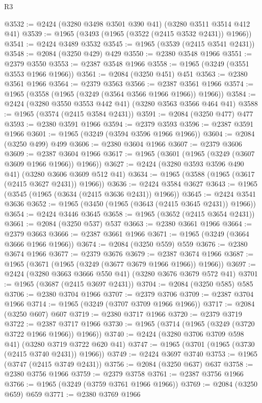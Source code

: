 \begin{lexlean}{R3}
\begin{coremodule}
@3532 := @2424 (@3280 @3498 @3501 @390 @41) (@3280 @3511 @3514 @412 @41)
@3539 := @1965 (@3493 (@1965 (@3522 (@2415 @3532 @2431)) @1966))
@3541 := @2424 @3489 @3532
@3545 := @1965 (@3539 (@2415 @3541 @2431))
@3548 := @2084 (@3250 @429) @429
@3550 := @2380 @3548 @1966
@3551 := @2379 @3550
@3553 := @2387 @3548 @1966
@3558 := @1965 (@3249 (@3551 @3553 @1966 @1966))
@3561 := @2084 (@3250 @451) @451
@3563 := @2380 @3561 @1966
@3564 := @2379 @3563
@3566 := @2387 @3561 @1966
@3574 := @1965 (@3558 (@1965 (@3249 (@3564 @3566 @1966 @1966)) @1966))
@3584 := @2424 (@3280 @3550 @3553 @442 @41) (@3280 @3563 @3566 @464 @41)
@3588 := @1965 (@3574 (@2415 @3584 @2431))
@3591 := @2084 (@3250 @477) @477
@3593 := @2380 @3591 @1966
@3594 := @2379 @3593
@3596 := @2387 @3591 @1966
@3601 := @1965 (@3249 (@3594 @3596 @1966 @1966))
@3604 := @2084 (@3250 @499) @499
@3606 := @2380 @3604 @1966
@3607 := @2379 @3606
@3609 := @2387 @3604 @1966
@3617 := @1965 (@3601 (@1965 (@3249 (@3607 @3609 @1966 @1966)) @1966))
@3627 := @2424 (@3280 @3593 @3596 @490 @41) (@3280 @3606 @3609 @512 @41)
@3634 := @1965 (@3588 (@1965 (@3617 (@2415 @3627 @2431)) @1966))
@3636 := @2424 @3584 @3627
@3643 := @1965 (@3545 (@1965 (@3634 (@2415 @3636 @2431)) @1966))
@3645 := @2424 @3541 @3636
@3652 := @1965 (@3450 (@1965 (@3643 (@2415 @3645 @2431)) @1966))
@3654 := @2424 @3446 @3645
@3658 := @1965 (@3652 (@2415 @3654 @2431))
@3661 := @2084 (@3250 @537) @537
@3663 := @2380 @3661 @1966
@3664 := @2379 @3663
@3666 := @2387 @3661 @1966
@3671 := @1965 (@3249 (@3664 @3666 @1966 @1966))
@3674 := @2084 (@3250 @559) @559
@3676 := @2380 @3674 @1966
@3677 := @2379 @3676
@3679 := @2387 @3674 @1966
@3687 := @1965 (@3671 (@1965 (@3249 (@3677 @3679 @1966 @1966)) @1966))
@3697 := @2424 (@3280 @3663 @3666 @550 @41) (@3280 @3676 @3679 @572 @41)
@3701 := @1965 (@3687 (@2415 @3697 @2431))
@3704 := @2084 (@3250 @585) @585
@3706 := @2380 @3704 @1966
@3707 := @2379 @3706
@3709 := @2387 @3704 @1966
@3714 := @1965 (@3249 (@3707 @3709 @1966 @1966))
@3717 := @2084 (@3250 @607) @607
@3719 := @2380 @3717 @1966
@3720 := @2379 @3719
@3722 := @2387 @3717 @1966
@3730 := @1965 (@3714 (@1965 (@3249 (@3720 @3722 @1966 @1966)) @1966))
@3740 := @2424 (@3280 @3706 @3709 @598 @41) (@3280 @3719 @3722 @620 @41)
@3747 := @1965 (@3701 (@1965 (@3730 (@2415 @3740 @2431)) @1966))
@3749 := @2424 @3697 @3740
@3753 := @1965 (@3747 (@2415 @3749 @2431))
@3756 := @2084 (@3250 @637) @637
@3758 := @2380 @3756 @1966
@3759 := @2379 @3758
@3761 := @2387 @3756 @1966
@3766 := @1965 (@3249 (@3759 @3761 @1966 @1966))
@3769 := @2084 (@3250 @659) @659
@3771 := @2380 @3769 @1966

\end{coremodule}
\end{lexlean}
